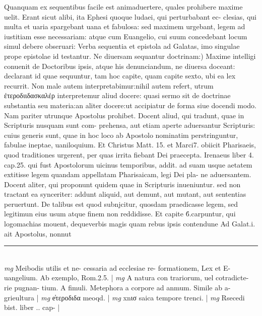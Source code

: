 \documentclass{article}
\begin{document}
\begin{pages}
Quanquam ex sequentibus facile est animaduertere, quales prohibere maxime uelit. Erant sicut alibi, ita Ephesi quoque  ludaei, qui perturbabant ec- clesias, qui multa et uaria spargebant uana et fabulosa: sed maximem urgebant, legem ad iustitiam esse necessariam: atque  cum Euangelio, cui suum concedebant locum simul debere obseruari: Verba sequentia et epistola ad Galatas, imo singulae prope epistolae id testantur.  \pend\pstart Ne diuersam sequantur doctrinam:) Maxime intelligi conuenit de Doctoribus ipsis, atque  his denunciandum, ne diuersa doceant: declarant id quae sequuntur, tam hoc capite, quam capite sexto, ubi ea lex recurrit. Non male autem interpretabimur:nihil autem refert, utrum ἐτεροδιιδασκαλέρ interpretemur aliud docere: quasi sermo sit de doctrinae substantia seu materia:an aliter docere:ut accipiatur de forma siue docendi modo. Nam pariter utrunque  Apostolus prohibet. Docent aliud, qui tradunt, quae in Scripturis nusquam sunt com- prehensa, aut etiam aperte aduersantur Scripturis: cuius generis sunt, quae in hoc loco ab Apostolo nominatim perstringuntur, fabulae ineptae, uaniloquium. Et Christus Matt. 15. et Marci7. obiicit Pharisaeis, quod traditiones urgerent, per quas irrita fiebant Dei praecepta. Irenaeus liber 4. cap.25. qui fust Apostolorum uicinus temporibus, addit. ad suam usque  aetatem extitisse legem quandam appellatam Pharisaicam, legi Dei pla- ne aduersantem. Docent aliter, qui proponunt quidem quae in Scripturis inueniuntur. sed non tractant ea synceriter: addunt aliquid, aut demunt, aut mutant, aut sententias peruertunt. De talibus est quod subnjcitur, quosdam praedicasse legem, sed legitimun eius usum atque  finem non reddidisse. Et capite 6́.carpuntur, qui logomachias mouent, dequeverbis magis quam rebus ipsis contendune Ad Galat.i. ait Apostolus, nonnut  \pend
\vspace{0.5cm}\noindent
\vspace{0.2cm}\rule{1cm}{0.2pt}\\ 
\hspace{0.2cm}\textit{mg}
\footnotesize Meibodis utilis et ne- cessaria ad ecclesiae re- formationem, Lex et E- uangelium. Ab exemplo, Rom.2.5. 
\normalsize| 
\hspace{0.2cm}\textit{mg}
\footnotesize A natura con trariorum, uel cotradicte- rie pugnan- tium. A fimuli. Metephora a corpore ad anmum. Simile ab a- grieultura 
\normalsize| 
\hspace{0.2cm}\textit{mg}
\footnotesize e̓τεροδιδα meoqd. 
\normalsize| 
\hspace{0.2cm}\textit{mg}
\footnotesize xnισ saica tempore trenci. 
\normalsize| 
\hspace{0.2cm}\textit{mg}
\footnotesize Rsecedi bist. liber .. cap- 
\normalsize| 

\end{pages}
\end{document}
